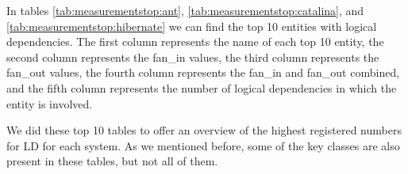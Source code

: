 \documentclass[12pt]{mitthesis}
\begin{document}
\begin{table}[!h]
\renewcommand{\arraystretch}{1}
\caption{Measurements for Hibernate key classes.}
\label{tab:measurementsfan:hibernate}
\centering
{}
\end{table}


In tables \ref{tab:measurementstop:ant}, \ref{tab:measurementstop:catalina}, and \ref{tab:measurementstop:hibernate} we can find the top 10 entities with logical dependencies. The first column represents the name of each top 10 entity, the second column represents the fan\_in values, the third column represents the fan\_out values, the fourth column represents the fan\_in and fan\_out combined, and the fifth column represents the number of logical dependencies in which the entity is involved.


We did these top 10 tables to offer an overview of the highest registered numbers for LD for each system. As we mentioned before, some of the key classes are also present in these tables, but not all of them.
\end{document}
